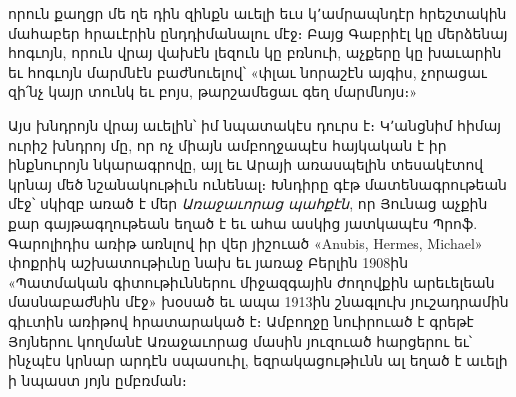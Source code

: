\documentclass{article}
\begin{document}
{որուն քաղցր մե ղե դին զինքն աւելի եւս կ՚ամրապնդէր հրեշտակին մահաբեր հրաւէրին ընդդիմանալու մէջ։ Բայց Գաբրիէլ կը մերձենայ հոգւոյն, որուն վրայ վախէն լեզուն կը բռնուի, աչքերը կը խաւարին եւ հոգւոյն մարմնէն բաժնուելով՝ «փլաւ նորաշէն այգիս, չորացաւ զի՛նչ կայր տունկ եւ բոյս, թարշամեցաւ գեղ մարմնոյս։»

Այս խնդրոյն վրայ աւելին՝ իմ նպատակէս դուրս է։ Կ՚անցնիմ հիմայ ուրիշ խնդրոյ մը, որ ոչ միայն ամբողջապէս հայկական է իր ինքնուրոյն նկարագրովը, այլ եւ Արայի առասպելին տեսակէտով կրնայ մեծ նշանակութիւն ունենալ։ Խնդիրը գէթ մատենագրութեան մէջ՝ սկիզբ առած է մեր \emph{Առաջաւորաց պահքէն}, որ Յունաց աչքին քար գայթագղութեան եղած է եւ ահա ասկից յատկապէս Պրոֆ. Գարոլիդիս առիթ առնլով իր վեր յիշուած «Anubis, Hermes, Michael» փոքրիկ աշխատութիւնը նախ եւ յառաջ Բերլին 1908ին «Պատմական գիտութիւններու միջազգային ժողովքին արեւելեան մասնաբաժնին մէջ» խօսած եւ ապա 1913ին շնագլուխ յուշադրամին գիւտին առիթով հրատարակած է։ Ամբողջը նուիրուած է գրեթէ Յոյներու կողմանէ Առաջաւորաց մասին յուզուած հարցերու եւ՝ ինչպէս կրնար արդէն սպասուիլ, եզրակացութիւնն ալ եղած է աւելի ի նպաստ յոյն ըմբռման։

}
\end{document}
